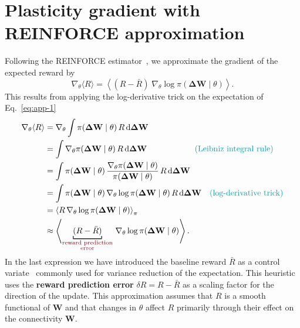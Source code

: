 \documentclass[mlabstract]{jmlr}
\newcommand{\de}{\text{d}}
\begin{document}
\section{Plasticity gradient with REINFORCE approximation}
Following the REINFORCE estimator~\citep{williams1992simple}, we approximate the gradient of the expected reward by
\begin{equation}\label{eq:app-1}
\nabla_\theta \langle R \rangle = \left\langle  (R - \bar{R}) \; \nabla_\theta \log \pi(\boldsymbol{\Delta}\mathbf{W} \mid \theta) \right\rangle.
\end{equation}
This results from applying the log-derivative trick on the expectation of Eq.~\ref{eq:app-1}
\begin{align*}
\nabla_\theta \langle R \rangle 
&=  \nabla_\theta \int \pi(\boldsymbol{\Delta}\mathbf{W} \mid \theta) \, R \, \de \boldsymbol{\Delta}\mathbf{W}  \\
&= \int \nabla_\theta \pi(\boldsymbol{\Delta}\mathbf{W} \mid \theta) \, R \, \de \boldsymbol{\Delta}\mathbf{W}  \quad \,\,\,\, \quad \quad \quad \, \quad \text{\color{cadetblue}{(Leibniz integral rule)}} \\
&= \int \pi(\boldsymbol{\Delta}\mathbf{W} \mid \theta) \, \frac{\nabla_\theta \pi(\boldsymbol{\Delta}\mathbf{W} \mid \theta)}{\pi(\boldsymbol{\Delta}\mathbf{W} \mid \theta)} \, R \, \de \boldsymbol{\Delta}\mathbf{W}  \\
&= \int \pi(\boldsymbol{\Delta}\mathbf{W} \mid \theta) \, \nabla_\theta \log \pi(\boldsymbol{\Delta}\mathbf{W} \mid \theta) \, R \, \de \boldsymbol{\Delta}\mathbf{W}  \quad \text{\color{cadetblue}{(log-derivative trick)}} \\
&= \left\langle  R \, \nabla_\theta \log \pi(\boldsymbol{\Delta}\mathbf{W} \mid \theta) \right\rangle_{ \pi} \\
&\approx \left\langle \underbracket[0.187ex]{(R - \bar{R})}_{\substack{\text{\color{carmine}{reward prediction}}\\[0.2ex]%
                \text{\color{carmine}{error}} }} \, \nabla_\theta \log \pi(\boldsymbol{\Delta}\mathbf{W} \mid \theta) \right\rangle .
\end{align*}
In the last expression we have introduced the baseline reward $\bar{R}$ as a control variate~\citep{lemieux2014control} commonly used for variance reduction of the expectation.
This heuristic uses the \textbf{reward prediction error} $\delta R = R - \bar{R}$ as a scaling factor for the direction of the update. This approximation assumes that $R$ is a smooth functional of $\mathbf{W}$ and that changes in $\theta$ affect $R$ primarily through their effect on the connectivity $\mathbf{W}$. 
\end{document}

